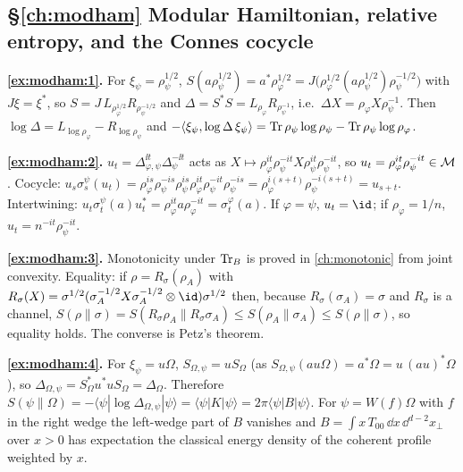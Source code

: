 {\subsection*{\S\ref{ch:modham} Modular Hamiltonian, relative entropy, and the Connes cocycle}
\textbf{\ref{ex:modham:1}.} For $\xi_\psi=\rho_\psi^{1/2}$, $S(a\rho_\psi^{1/2})=a^*\rho_\varphi^{1/2}=J\big(\rho_\varphi^{1/2}(a\rho_\psi^{1/2})\rho_\psi^{-1/2}\big)$ with $J\xi=\xi^*$, so $S=J\,L_{\rho_\varphi^{1/2}}R_{\rho_\psi^{-1/2}}$ and $\Delta=S^*S=L_{\rho_\varphi}R_{\rho_\psi^{-1}}$, i.e.\ $\Delta X=\rho_\varphi X\rho_\psi^{-1}$. Then $\log\Delta=L_{\log\rho_\varphi}-R_{\log\rho_\psi}$ and $-\langle\xi_\psi,\log\Delta\,\xi_\psi\rangle=\operatorname{Tr}\rho_\psi\log\rho_\psi-\operatorname{Tr}\rho_\psi\log\rho_\varphi$.\par
\textbf{\ref{ex:modham:2}.} $u_t=\Delta_{\varphi,\psi}^{\ii t}\Delta_\psi^{-\ii t}$ acts as $X\mapsto\rho_\varphi^{it}\rho_\psi^{-it}X\rho_\psi^{it}\rho_\psi^{-it}$, so $u_t=\rho_\varphi^{it}\rho_\psi^{-it}\in\mathcal{M}$. Cocycle: $u_s\sigma_s^\psi(u_t)=\rho_\varphi^{is}\rho_\psi^{-is}\rho_\psi^{is}\rho_\varphi^{it}\rho_\psi^{-it}\rho_\psi^{-is}=\rho_\varphi^{i(s+t)}\rho_\psi^{-i(s+t)}=u_{s+t}$. Intertwining: $u_t\sigma_t^\psi(a)u_t^*=\rho_\varphi^{it}a\rho_\varphi^{-it}=\sigma_t^\varphi(a)$. If $\varphi=\psi$, $u_t=\id$; if $\rho_\varphi=1/n$, $u_t=n^{-it}\rho_\psi^{-it}$.\par
\textbf{\ref{ex:modham:3}.} Monotonicity under $\operatorname{Tr}_B$ is proved in \cref{ch:monotonic} from joint convexity. Equality: if $\rho=R_\sigma(\rho_A)$ with $R_\sigma(X)=\sigma^{1/2}(\sigma_A^{-1/2}X\sigma_A^{-1/2}\otimes\id)\sigma^{1/2}$ then, because $R_\sigma(\sigma_A)=\sigma$ and $R_\sigma$ is a channel, $S(\rho\|\sigma)=S(R_\sigma\rho_A\|R_\sigma\sigma_A)\le S(\rho_A\|\sigma_A)\le S(\rho\|\sigma)$, so equality holds. The converse is Petz's theorem.\par
\textbf{\ref{ex:modham:4}.} For $\xi_\psi=u\Omega$, $S_{\Omega,\psi}=uS_\Omega$ (as $S_{\Omega,\psi}(au\Omega)=a^*\Omega=u\,(au)^*\Omega$), so $\Delta_{\Omega,\psi}=S_\Omega^*u^*uS_\Omega=\Delta_\Omega$. Therefore $S(\psi\|\Omega)=-\langle\psi|\log\Delta_{\Omega,\psi}|\psi\rangle=\langle\psi|K|\psi\rangle=2\pi\langle\psi|B|\psi\rangle$. For $\psi=W(f)\Omega$ with $f$ in the right wedge the left-wedge part of $B$ vanishes and $B=\int x\,T_{00}\,\dd x\,\dd^{d-2}x_\perp$ over $x>0$ has expectation the classical energy density of the coherent profile weighted by $x$.\par

}

